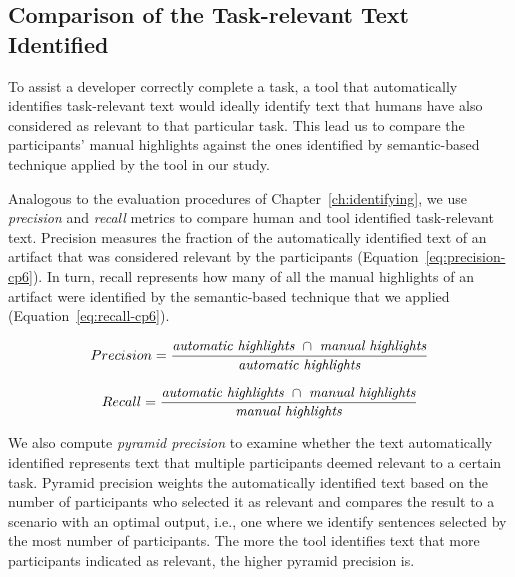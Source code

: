 
\subsection{Comparison of the Task-relevant Text Identified}
\label{cp6:comparison}


To assist a developer correctly complete a task, a tool that
automatically identifies task-relevant text would ideally 
identify text that humans have also considered as relevant to that particular task. 
This lead us to compare the participants' manual highlights against the ones 
identified by semantic-based technique applied by the tool in our study.
 



Analogous to the evaluation procedures of Chapter~\ref{ch:identifying}, we use 
\textit{precision} and \textit{recall} metrics
to compare human and tool identified task-relevant text.
Precision measures the fraction of the automatically identified text of an artifact that was  considered relevant
by the participants (Equation~\ref{eq:precision-cp6}). 
In turn, recall represents how many of all the manual highlights of an artifact were identified by the semantic-based technique that we applied (Equation~\ref{eq:recall-cp6}). 

\smallskip
\begin{small}


\begin{equation}
    Precision = \frac{
        \text{\textit{automatic highlights}~} \cap 
        \text{~\textit{manual highlights}}
    }{\text{\textit{automatic highlights}}}
\label{eq:precision-cp6}    
\end{equation}
\end{small}


\begin{small}
\begin{equation}
    Recall = \frac{
        \text{\textit{automatic highlights}~} \cap 
        \text{~\textit{manual highlights}}
    }{\text{\textit{manual highlights}}}
\label{eq:recall-cp6}    
\end{equation}
\end{small}

\medskip


We also compute \textit{pyramid precision} to examine whether the text automatically identified represents text that multiple participants deemed relevant to a certain task.
Pyramid precision weights the automatically identified text based on the number of participants who selected it as relevant and compares the result to a scenario with an optimal output, i.e., one where we identify sentences selected by the most number of participants.   
The more the tool identifies text that more participants indicated as relevant, the higher pyramid precision is.

